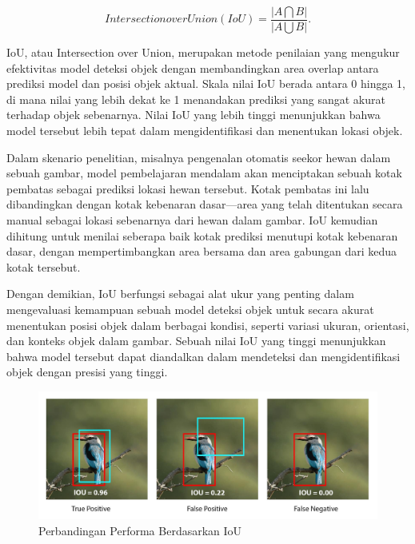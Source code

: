 \begin{equation}
IntersectionoverUnion(IoU) = \frac{\left |A\bigcap B  \right |}{\left | A\bigcup B \right |}.
\end{equation}

IoU, atau Intersection over Union, merupakan metode penilaian yang mengukur efektivitas model deteksi objek dengan membandingkan area overlap antara prediksi model dan posisi objek aktual. Skala nilai IoU berada antara 0 hingga 1, di mana nilai yang lebih dekat ke 1 menandakan prediksi yang sangat akurat terhadap objek sebenarnya. Nilai IoU yang lebih tinggi menunjukkan bahwa model tersebut lebih tepat dalam mengidentifikasi dan menentukan lokasi objek.

Dalam skenario penelitian, misalnya pengenalan otomatis seekor hewan dalam sebuah gambar, model pembelajaran mendalam akan menciptakan sebuah kotak pembatas sebagai prediksi lokasi hewan tersebut. Kotak pembatas ini lalu dibandingkan dengan kotak kebenaran dasar—area yang telah ditentukan secara manual sebagai lokasi sebenarnya dari hewan dalam gambar. IoU kemudian dihitung untuk menilai seberapa baik kotak prediksi menutupi kotak kebenaran dasar, dengan mempertimbangkan area bersama dan area gabungan dari kedua kotak tersebut.

Dengan demikian, IoU berfungsi sebagai alat ukur yang penting dalam mengevaluasi kemampuan sebuah model deteksi objek untuk secara akurat menentukan posisi objek dalam berbagai kondisi, seperti variasi ukuran, orientasi, dan konteks objek dalam gambar. Sebuah nilai IoU yang tinggi menunjukkan bahwa model tersebut dapat diandalkan dalam mendeteksi dan mengidentifikasi objek dengan presisi yang tinggi.

\begin{figure}[H]
  \centering

  \includegraphics[scale=0.3]{gambar/Perbandingan nilai iou.jpg}

  \caption{Perbandingan Performa Berdasarkan IoU}
  \label{fig:roketluarangkasa}
\end{figure}


